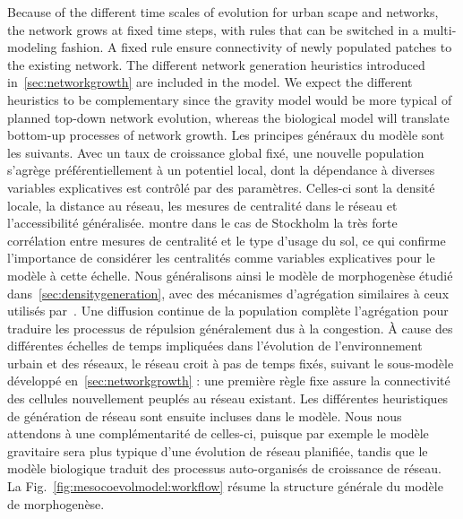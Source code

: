 {Because of the different time scales of evolution for urban scape and networks, the network grows at fixed time steps, with rules that can be switched in a multi-modeling fashion. A fixed rule ensure connectivity of newly populated patches to the existing network.
The different network generation heuristics introduced in~\ref{sec:networkgrowth} are included in the model.
We expect the different heuristics to be complementary since the gravity model would be more typical of planned top-down network evolution, whereas the biological model will translate bottom-up processes of network growth. 
}{
Les principes généraux du modèle sont les suivants. Avec un taux de croissance global fixé, une nouvelle population s'agrège préférentiellement à un potentiel local, dont la dépendance à diverses variables explicatives est contrôlé par des paramètres. Celles-ci sont la densité locale, la distance au réseau, les mesures de centralité dans le réseau et l'accessibilité généralisée. \cite{doi:10.1080/13658816.2014.893347} montre dans le cas de Stockholm la très forte corrélation entre mesures de centralité et le type d'usage du sol, ce qui confirme l'importance de considérer les centralités comme variables explicatives pour le modèle à cette échelle. Nous généralisons ainsi le modèle de morphogenèse étudié dans~\ref{sec:densitygeneration}, avec des mécanismes d'agrégation similaires à ceux utilisés par~\cite{raimbault2014hybrid}. Une diffusion continue de la population complète l'agrégation pour traduire les processus de répulsion généralement dus à la congestion. À cause des différentes échelles de temps impliquées dans l'évolution de l'environnement urbain et des réseaux, le réseau croit à pas de temps fixés, suivant le sous-modèle développé en~\ref{sec:networkgrowth} : une première règle fixe assure la connectivité des cellules nouvellement peuplés au réseau existant. Les différentes heuristiques de génération de réseau sont ensuite incluses dans le modèle. Nous nous attendons à une complémentarité de celles-ci, puisque par exemple le modèle gravitaire sera plus typique d'une évolution de réseau planifiée, tandis que le modèle biologique traduit des processus auto-organisés de croissance de réseau. La Fig.~\ref{fig:mesocoevolmodel:workflow} résume la structure générale du modèle de morphogenèse.
}




